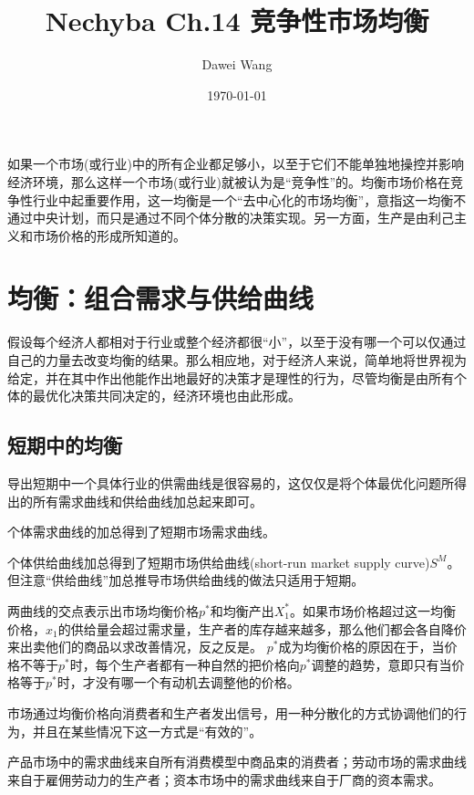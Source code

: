 \documentclass{article}
\title{Nechyba Ch.14 竞争性市场均衡}
\author{Dawei Wang}
\date{\today}
\begin{document}
	\maketitle
如果一个市场(或行业)中的所有企业都足够小，以至于它们不能单独地操控并影响经济环境，那么这样一个市场(或行业)就被认为是“竞争性”的。均衡市场价格在竞争性行业中起重要作用，这一均衡是一个“去中心化的市场均衡”，意指这一均衡不通过中央计划，而只是通过不同个体分散的决策实现。另一方面，生产是由利己主义和市场价格的形成所知道的。

\section{均衡：组合需求与供给曲线}

假设每个经济人都相对于行业或整个经济都很“小”，以至于没有哪一个可以仅通过自己的力量去改变均衡的结果。那么相应地，对于经济人来说，简单地将世界视为给定，并在其中作出他能作出地最好的决策才是理性的行为，尽管均衡是由所有个体的最优化决策共同决定的，经济环境也由此形成。

\subsection{短期中的均衡}
导出短期中一个具体行业的供需曲线是很容易的，这仅仅是将个体最优化问题所得出的所有需求曲线和供给曲线加总起来即可。

\hspace*{\fill}

个体需求曲线的加总得到了短期市场需求曲线。

个体供给曲线加总得到了短期市场供给曲线(short-run market supply curve)$ S^M $。但注意“供给曲线”加总推导市场供给曲线的做法只适用于短期。


\hspace{\fill}

两曲线的交点表示出市场均衡价格$ p^* $和均衡产出$ X_1^* $。如果市场价格超过这一均衡价格，$ x_1 $的供给量会超过需求量，生产者的库存越来越多，那么他们都会各自降价来出卖他们的商品以求改善情况，反之反是。
$ p^* $成为均衡价格的原因在于，当价格不等于$ p^* $时，每个生产者都有一种自然的把价格向$ p^* $调整的趋势，意即只有当价格等于$ p^* $时，才没有哪一个有动机去调整他的价格。

市场通过均衡价格向消费者和生产者发出信号，用一种分散化的方式协调他们的行为，并且在某些情况下这一方式是“有效的”。

产品市场中的需求曲线来自所有消费模型中商品束的消费者；劳动市场的需求曲线来自于雇佣劳动力的生产者；资本市场中的需求曲线来自于厂商的资本需求。
\end{document}
